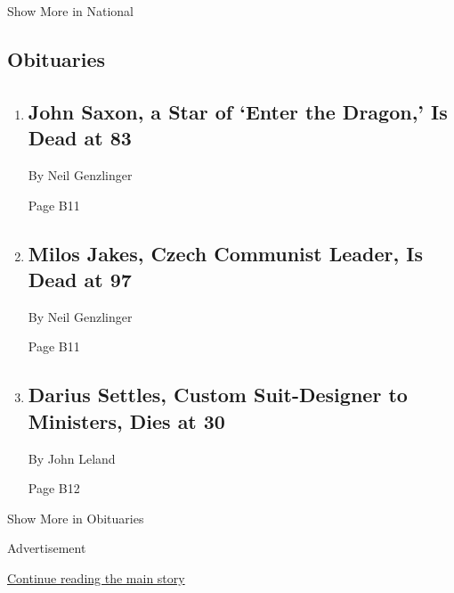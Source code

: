 Show More in National

\hypertarget{obituaries}{%
\subsection{Obituaries}\label{obituaries}}

\begin{enumerate}
\def\labelenumi{\arabic{enumi}.}
\item
  \href{/2020/07/28/arts/television/john-saxon-dead.html}{}

  \hypertarget{john-saxon-a-star-of-enter-the-dragon-is-dead-at-83}{%
  \subsection{John Saxon, a Star of `Enter the Dragon,' Is Dead at
  83}\label{john-saxon-a-star-of-enter-the-dragon-is-dead-at-83}}

  By Neil Genzlinger

  Page B11
\item
  \href{/2020/07/25/world/europe/milos-jakes-dead.html}{}

  \hypertarget{milos-jakes-czech-communist-leader-is-dead-at-97}{%
  \subsection{Milos Jakes, Czech Communist Leader, Is Dead at
  97}\label{milos-jakes-czech-communist-leader-is-dead-at-97}}

  By Neil Genzlinger

  Page B11
\item
  \href{/2020/07/27/obituaries/darius-settles-dead-coronavirus.html}{}

  \hypertarget{darius-settles-custom-suit-designer-to-ministers-dies-at-30}{%
  \subsection{Darius Settles, Custom Suit-Designer to Ministers, Dies at
  30}\label{darius-settles-custom-suit-designer-to-ministers-dies-at-30}}

  By John Leland

  Page B12
\end{enumerate}

Show More in Obituaries

Advertisement

\protect\hyperlink{after-mid3}{Continue reading the main story}

